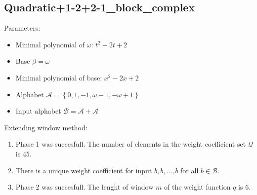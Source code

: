 \subsection{ Quadratic+1-2+2-1\_block\_complex }

\label{subsec:Quadratic+1-2+2-1blockcomplex}

Parameters:
\begin{itemize}
    \item Minimal polynomial of $\omega$: $ t^{2} - 2t + 2 $
    \item Base $\beta= \omega $
    \item Minimal polynomial of base: $ x^{2} - 2x + 2 $
    \item Alphabet $\mathcal{A} =\left\{0, 1, -1, \omega - 1, -\omega + 1\right\}$
    \item Input alphabet $\mathcal{B} =\mathcal{A}+ \mathcal{A}$
\end{itemize}

\noindent Extending window method:
\begin{enumerate}
    \item Phase 1 was succesfull.
The number of elements in the weight coefficient set $\mathcal{Q}$ is $45$.

    \item There is a unique weight coefficient for input $b,b,\dots,b$ for all $b\in\mathcal{B}$.

    \item Phase 2 was succesfull.
The lenght of window $m$ of the weight function $q$ is 6.
\end{enumerate}
